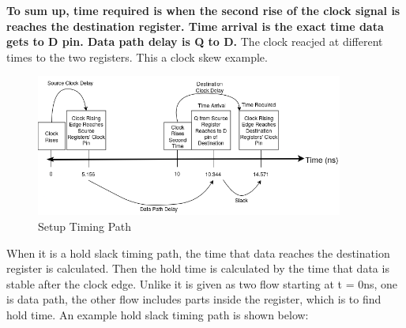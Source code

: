 \documentclass{report}
\begin{document}
\textbf{To sum up, time required is when the second rise of the clock signal is reaches the destination register. Time arrival is the exact time data gets to D pin. Data path delay is Q to D.} The clock reacjed at different times to the two registers. This a clock skew example.


\begin{figure}[h!]
    \centering
    \includegraphics[width=0.9\textwidth]{images/setup_analys.png}
    \caption{Setup Timing Path}
    \label{fig:setup_timing_path}
\end{figure}

When it is a hold slack timing path, the time that data reaches the destination register is calculated. Then the hold time is calculated by the time that data is stable after the clock edge.
Unlike it is given as two flow starting at t = 0ns, one is data path, the other flow includes parts inside the register, which is to find hold time. 
An example hold slack timing path is shown below:
\end{document}

